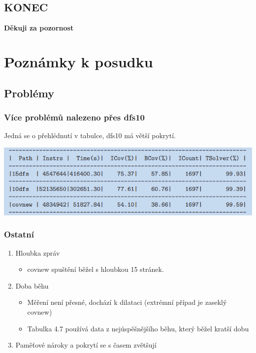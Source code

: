 \documentclass{beamer}
\begin{document}
\subsection*{KONEC}
\begin{frame}
\begin{center}
{\bf\Large Děkuji za pozornost}
\end{center}
\end{frame}

\appendix
\section{Poznámky k posudku}
\subsection{Problémy}
\begin{frame}
\frametitle{Více problémů nalezeno přes dfs10}
    Jedná se o přehlédnutí v tabulce, dfs10 má větší pokrytí.
    \begin{center}
    \includegraphics[scale=0.6]{tabulka.png}
    \end{center}
\end{frame}

\begin{frame}
\frametitle{Ostatní}
\begin{enumerate}
    \item Hloubka zpráv
    \begin{itemize}
        \item covnew spuštění běžel s hloubkou 15 stránek.
    \end{itemize}
    \item Doba běhu
    \begin{itemize}
        \item Měření není přesné, dochází k dilataci (extrémní případ je zaseklý covnew)
        \item Tabulka 4.7 používá data z nejúspěšnějšího běhu, který běžel kratší dobu
    \end{itemize}
    \item Paměťové nároky a pokrytí se s časem zvětšují
\end{enumerate}
\end{frame}
\end{document}

